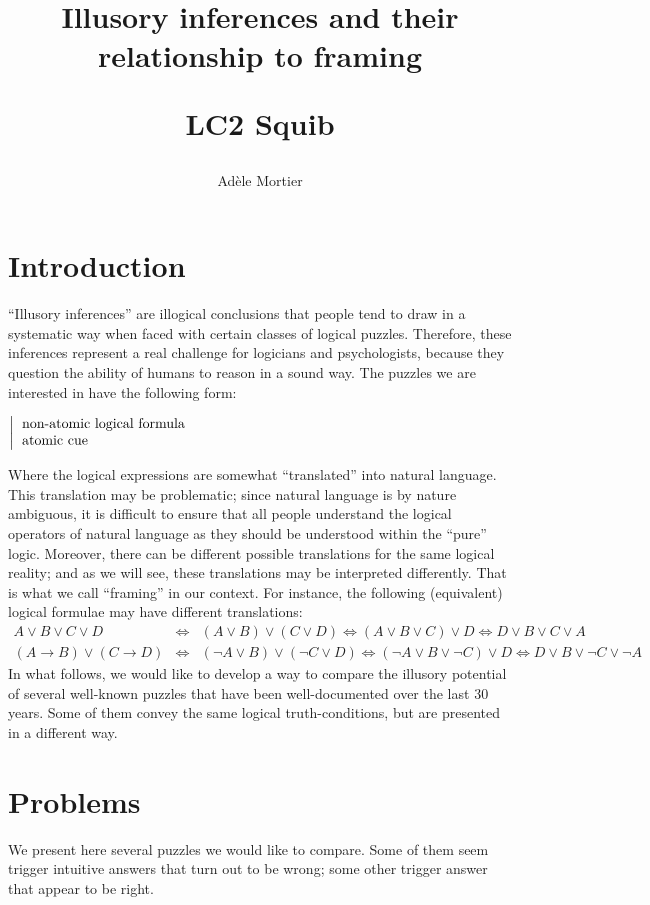 \documentclass[french]{article}
\title{Illusory inferences and their relationship to framing \\  \begin{large}
		LC2 Squib
\end{large}}
\author{Adèle Mortier}
\begin{document}
\maketitle
\section{Introduction}
``Illusory inferences'' are illogical conclusions that people tend to draw in a systematic way when faced with certain classes of logical puzzles. Therefore, these inferences represent a real challenge for logicians and psychologists, because they question the ability of humans to reason in a sound way. The puzzles we are interested in have the following form:
\begin{center}
	$\left |
	\begin{tabular}{l}
	non-atomic logical formula\\
	atomic cue
\end{tabular}\right.$
\end{center}
Where the logical expressions are somewhat ``translated'' into natural language. This translation may be problematic; since natural language is by nature ambiguous, it is difficult to ensure that all people understand the logical operators of natural language as they should be understood within the ``pure'' logic. Moreover, there can be different possible translations for the same logical reality; and as we will see, these translations may be interpreted differently. That is what we call ``framing'' in our context. For instance, the following (equivalent) logical formulae may have different translations:
\begin{eqnarray*}
A \vee B \vee C \vee D &\iff& (A \vee B) \vee (C \vee D) \iff (A \vee B \vee C) \vee D \iff D \vee B \vee C \vee A \\
(A \rightarrow B) \vee (C \rightarrow D) &\iff& (\neg A \vee B) \vee (\neg C \vee D) \iff (\neg A \vee B \vee \neg C) \vee D \iff D \vee B \vee \neg C \vee \neg A
\end{eqnarray*}
In what follows, we would like to develop a way to compare the illusory potential of several well-known puzzles that have been well-documented over the last 30 years. Some of them convey the same logical truth-conditions, but are presented in a different way.
\section{Problems}
We present here several puzzles we would like to compare. Some of them seem trigger intuitive answers that turn out to be wrong; some other trigger answer that appear to be right.\\
\end{document}
